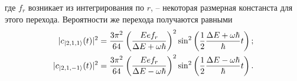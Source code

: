 где $f_r$ возникает из интегрирования по $r$, -- некоторая размерная констанста для этого перехода.
Вероятности же перехода получаются равными
\begin{align*}
    |c_{\left| 2,1,1 \right\rangle} (t)|^2 &= 
        \frac{3\pi^2}{64} \left(\frac{E e f_r}{\Delta E + \omega \hbar}\right)^2  \sin^2\left(
            \frac{1}{2} \frac{\Delta E + \omega \hbar}{ \hbar} t
        \right);
    \\
    |c_{\left| 2,1,-1 \right\rangle} (t)|^2 &=  
        \frac{3\pi^2}{64} \left(\frac{E e f_r}{\Delta E - \omega \hbar}\right)^2  \sin^2\left(
            \frac{1}{2} \frac{\Delta E - \omega \hbar}{ \hbar} t
        \right).
    \\
\end{align*}
